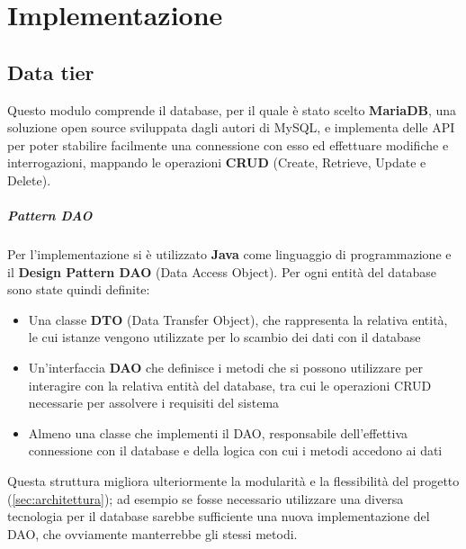 
\chapter{Implementazione}


\section{Data tier}
Questo modulo comprende il database, per il quale è stato scelto \textbf{MariaDB},
una soluzione open source sviluppata dagli autori di MySQL, e implementa delle
API per poter stabilire facilmente una connessione con esso ed effettuare
modifiche e interrogazioni, mappando le operazioni \textbf{CRUD} (Create, Retrieve,
Update e Delete).

\paragraph{Pattern DAO}
Per l'implementazione si è utilizzato \textbf{Java} come linguaggio di programmazione
e il \textbf{Design Pattern DAO} (Data Access Object). Per ogni entità del database
sono state quindi definite:
\begin{itemize}
	\item Una classe \textbf{DTO} (Data Transfer Object), che rappresenta la
	relativa entità, le cui istanze vengono utilizzate per lo scambio dei dati
	con il database
	\item Un'interfaccia \textbf{DAO} che definisce i metodi che si possono
	utilizzare per interagire con la relativa entità del database, tra cui le
	operazioni CRUD necessarie per assolvere i requisiti del sistema
	\item Almeno una classe che implementi il DAO, responsabile dell'effettiva
	connessione con il database e della logica con cui i metodi accedono ai dati
\end{itemize}



Questa struttura migliora ulteriormente la modularità e la flessibilità del
progetto (\autoref{sec:architettura}); ad esempio se fosse necessario utilizzare
una diversa tecnologia per il database sarebbe sufficiente una nuova
implementazione del DAO, che ovviamente manterrebbe gli stessi metodi.

